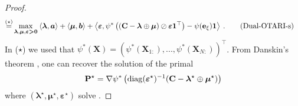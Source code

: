\begin{proof}
\begin{align}
    \stackrel{(\star)}{=} &\max_{\bm{\lambda}, \bm{\mu}, \bm{\varepsilon} \bm{>} \bm{0}} \: \langle \bm{\lambda}, \bm{a} \rangle + \langle \bm{\mu}, \bm{b} \rangle + \left\langle \bm{\varepsilon}, \psi^*\left(({\mathbf{C}} - \bm{\lambda} \oplus \bm{\mu}) \oslash \bm{\varepsilon} \bm{1}^\top \right) - \psi(\mathbf{e}_\xi) \bm{1} \right\rangle \:.
    \label{eq:dual-otari-s}
    \tag{Dual-OTARI-s}
\end{align}
In ($\star$) we used that $\psi^*(\mathbf{X}) = \left(\psi^*(\mathbf{X}_{1:}), ..., \psi^*(\mathbf{X}_{N:})\right)^\top$.
From Danskin's theorem \citep{danskin1966theory}, one can recover the solution of the primal
\begin{align}
    {\mathbf{P}}^\star = \nabla \psi^* \left(\operatorname{diag}(\bm{\varepsilon}^\star)^{-1} (\mathbf{C} - \bm{\lambda}^\star \oplus \bm{\mu}^\star) \right)
\end{align}
where $(\bm{\lambda}^\star, \bm{\mu}^\star, \bm{\varepsilon}^\star)$ solve .
\end{proof}

